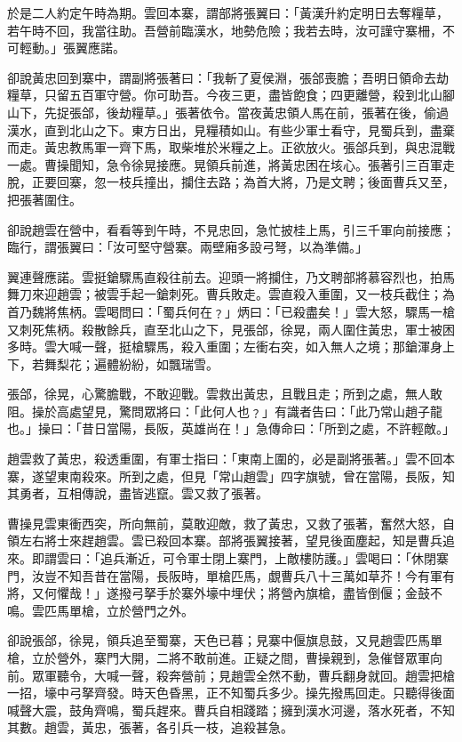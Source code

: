 於是二人約定午時為期。雲回本寨，謂部將張翼曰：「黃漢升約定明日去奪糧草，若午時不回，我當往助。吾營前臨漢水，地勢危險；我若去時，汝可謹守寨柵，不可輕動。」張翼應諾。

卻說黃忠回到寨中，謂副將張著曰：「我斬了夏侯淵，張郃喪膽；吾明日領命去劫糧草，只留五百軍守營。你可助吾。今夜三更，盡皆飽食；四更離營，殺到北山腳山下，先捉張郃，後劫糧草。」張著依令。當夜黃忠領人馬在前，張著在後，偷過漢水，直到北山之下。東方日出，見糧積如山。有些少軍士看守，見蜀兵到，盡棄而走。黃忠教馬軍一齊下馬，取柴堆於米糧之上。正欲放火。張郃兵到，與忠混戰一處。曹操聞知，急令徐晃接應。晃領兵前進，將黃忠困在垓心。張著引三百軍走脫，正要回寨，忽一枝兵撞出，攔住去路；為首大將，乃是文聘；後面曹兵又至，把張著圍住。

卻說趙雲在營中，看看等到午時，不見忠回，急忙披桂上馬，引三千軍向前接應；臨行，謂張翼曰：「汝可堅守營寨。兩壁廂多設弓弩，以為準備。」

翼連聲應諾。雲挺鎗驟馬直殺往前去。迎頭一將攔住，乃文聘部將慕容烈也，拍馬舞刀來迎趙雲；被雲手起一鎗刺死。曹兵敗走。雲直殺入重圍，又一枝兵截住；為首乃魏將焦柄。雲喝問曰：「蜀兵何在﹖」炳曰：「已殺盡矣！」雲大怒，驟馬一槍又刺死焦柄。殺散餘兵，直至北山之下，見張郃，徐晃，兩人圍住黃忠，軍士被困多時。雲大喊一聲，挺槍驟馬，殺入重圍；左衝右突，如入無人之境；那鎗渾身上下，若舞梨花；遍體紛紛，如飄瑞雪。

張郃，徐晃，心驚膽戰，不敢迎戰。雲救出黃忠，且戰且走；所到之處，無人敢阻。操於高處望見，驚問眾將曰：「此何人也﹖」有識者告曰：「此乃常山趙子龍也。」操曰：「昔日當陽，長阪，英雄尚在！」急傳命曰：「所到之處，不許輕敵。」

趙雲救了黃忠，殺透重圍，有軍士指曰：「東南上圍的，必是副將張著。」雲不回本寨，遂望東南殺來。所到之處，但見「常山趙雲」四字旗號，曾在當陽，長阪，知其勇者，互相傳說，盡皆逃竄。雲又救了張著。

曹操見雲東衝西突，所向無前，莫敢迎敵，救了黃忠，又救了張著，奮然大怒，自領左右將士來趕趙雲。雲已殺回本寨。部將張翼接著，望見後面塵起，知是曹兵追來。即謂雲曰：「追兵漸近，可令軍士閉上寨門，上敵樓防護。」雲喝曰：「休閉寨門，汝豈不知吾昔在當陽，長阪時，單槍匹馬，覷曹兵八十三萬如草芥！今有軍有將，又何懼哉！」遂撥弓拏手於寨外壕中埋伏；將營內旗槍，盡皆倒偃；金鼓不鳴。雲匹馬單槍，立於營門之外。

卻說張郃，徐晃，領兵追至蜀寨，天色已暮；見寨中偃旗息鼓，又見趙雲匹馬單槍，立於營外，寨門大開，二將不敢前進。正疑之間，曹操親到，急催督眾軍向前。眾軍聽令，大喊一聲，殺奔營前；見趙雲全然不動，曹兵翻身就回。趙雲把槍一招，壕中弓拏齊發。時天色昏黑，正不知蜀兵多少。操先撥馬回走。只聽得後面喊聲大震，鼓角齊鳴，蜀兵趕來。曹兵自相踐踏；擁到漢水河邊，落水死者，不知其數。趙雲，黃忠，張著，各引兵一枝，追殺甚急。

